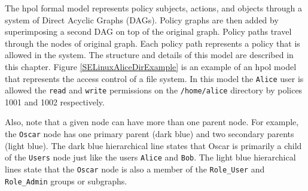\documentclass[12pt,letterpaper]{report}
\newcommand{\node}[1]{\texttt{#1}}
\begin{document}




The \ac{hpol} formal model represents policy subjects, actions, and objects through a system of Direct Acyclic Graphs (DAGs). Policy graphs are then added by superimposing a second DAG on top of the original graph. Policy paths travel through the nodes of original graph. Each policy path represents a policy that is allowed in the system. The structure and details of this model are described in this chapter. Figure \ref{SELinuxAliceDirExample} is an example of an \ac{hpol} model that represents the access control of a file system. In this model the \node{Alice} user is allowed the \texttt{read} and \texttt{write} permissions on the \node{/home/alice} directory by polices 1001 and 1002 respectively. 

Also, note that a given node can have more than one parent node. For example, the \node{Oscar} node has one primary parent (dark blue) and two secondary parents (light blue). The dark blue hierarchical line states that Oscar is primarily a child of the \node{Users} node just like the users \node{Alice} and \node{Bob}. The light blue hierarchical lines state that the \node{Oscar} node is also a member of the \node{Role\_User} and \node{Role\_Admin} groups or subgraphs. 
\end{document}
